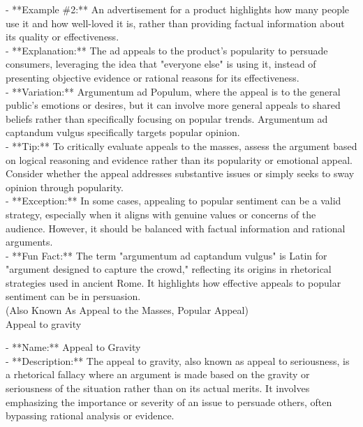 \documentclass[a4paper,12pt,single,pdftex]{scrartcl}
\begin{document}
    
      - **Example \#2:** An advertisement for a product highlights how many people use it and how well-loved it is, rather than providing factual information about its quality or effectiveness.
    \\

    
      - **Explanation:** The ad appeals to the product's popularity to persuade consumers, leveraging the idea that "everyone else" is using it, instead of presenting objective evidence or rational reasons for its effectiveness.
    \\

    
      - **Variation:** Argumentum ad Populum, where the appeal is to the general public's emotions or desires, but it can involve more general appeals to shared beliefs rather than specifically focusing on popular trends. Argumentum ad captandum vulgus specifically targets popular opinion.
    \\

    
      - **Tip:** To critically evaluate appeals to the masses, assess the argument based on logical reasoning and evidence rather than its popularity or emotional appeal. Consider whether the appeal addresses substantive issues or simply seeks to sway opinion through popularity.
    \\

    
      - **Exception:** In some cases, appealing to popular sentiment can be a valid strategy, especially when it aligns with genuine values or concerns of the audience. However, it should be balanced with factual information and rational arguments.
    \\

    
      - **Fun Fact:** The term "argumentum ad captandum vulgus" is Latin for "argument designed to capture the crowd," reflecting its origins in rhetorical strategies used in ancient Rome. It highlights how effective appeals to popular sentiment can be in persuasion.
    \\

  
    
      (Also Known As Appeal to the Masses, Popular Appeal)
    \\

  

Appeal to gravity
    
      - **Name:** Appeal to Gravity
    \\

    
      - **Description:** The appeal to gravity, also known as appeal to seriousness, is a rhetorical fallacy where an argument is made based on the gravity or seriousness of the situation rather than on its actual merits. It involves emphasizing the importance or severity of an issue to persuade others, often bypassing rational analysis or evidence.
    \\
\end{document}
